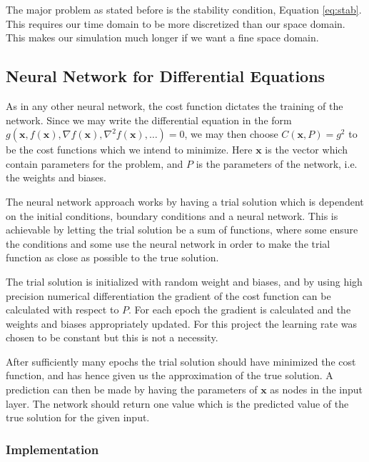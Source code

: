 \documentclass[aps,reprint,superscriptaddress,nofootinbib]{revtex4-2}
\begin{document}
    The major problem as stated before is the stability condition, Equation \eqref{eq:stab}. This requires our time domain to be more discretized than our space domain. This makes our simulation much longer if we want a fine space domain.

\subsection{Neural Network for Differential Equations}

As in any other neural network, the cost function dictates the training of the network. Since we may write the differential equation in the form $g(\bm x, f(\bm x), \nabla f(\bm x), \nabla^2f(\bm x), \dots) = 0$, we may then choose $C(\bm x, P) = g^2$ to be the cost functions which we intend to minimize. Here $\bm x$ is the vector which contain parameters for the problem, and $P$ is the parameters of the network, i.e. the weights and biases.

The neural network approach works by having a trial solution which is dependent on the initial conditions, boundary conditions and a neural network. This is achievable by letting the trial solution be a sum of functions, where some ensure the conditions and some use the neural network in order to make the trial function as close as possible to the true solution. 

The trial solution is initialized with random weight and biases, and by using high precision numerical differentiation the gradient of the cost function can be calculated with respect to $P$. For each epoch the gradient is calculated and the weights and biases appropriately updated. For this project the learning rate was chosen to be constant but this is not a necessity.

After sufficiently many epochs the trial solution should have minimized the cost function, and has hence given us the approximation of the true solution. A prediction can then be made by having the parameters of $\bm x$ as nodes in the input layer. The network should return one value which is the predicted value of the true solution for the given input.

\subsubsection{Implementation}
\end{document}
